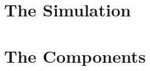 \documentclass{book}
\begin{document}


\tableofcontents

\part{The Simulation}
\label{part:simulation}



\part{The Components}
\label{part:components}



\appendix{}




\printindex
\end{document}
